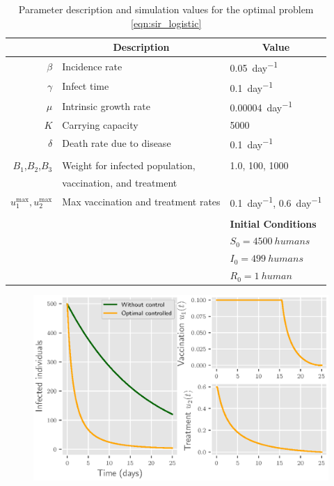 \begin{table}[htb]
  \begin{center}
    \begin{tabular}{@{}rll@{}} 
      \toprule
      &
      \multicolumn{1}{c}{\textbf{Description}}
      & 
      \multicolumn{1}{c}{\textbf{Value}}
      \\
        \midrule
        $\beta$
          & Incidence rate
          & \SI{0.05}{day^{-1}}
      \\
      $\gamma$
        & Infect time
        & \SI{0.1}{day^{-1}}
      \\
      $\mu$
        & Intrinsic growth rate
        & \SI{0.00004}{day^{-1}}
      \\
        $K$
        & Carrying capacity
        & \num{5000}
      \\
      $\delta$
        & Death rate due to disease
        & \SI{0.1}{day^{-1}}
      \\
      \\  
      $B_1$,$B_2$,$B_3$
        & Weight for infected population,
        & \num{1.0}, \num{100}, \num{1000}
        \\
        & vaccination, and treatment 
      \\
      $u_1^{\max}, u_2^{\max}$
        & Max vaccination and treatment rates
        & \SI{0.1}{day^{-1}}, \SI{0.6}{day^{-1}}
      \\
      \\
      && \textbf{Initial Conditions}
      \\
      \cmidrule{3-3}
      && $S_0 = \SI{4500}{humans}$
      \\
      && $I_0 = \SI{499}{humans}$
      \\
      && $R_0 = \SI{1}{human}$
      \\
      \bottomrule
    \end{tabular}
    \caption{Parameter description and simulation values for the optimal problem
      \eqref{eqn:sir_logistic}
    }
    \label{tbl:sir_logistic}
	\end{center}
\end{table}
%
\begin{figure}
  \centering
  \includegraphics{Figures/figure_1_sir_log}
  \caption{}
  \label{fig:figure1sirlog}
\end{figure}

